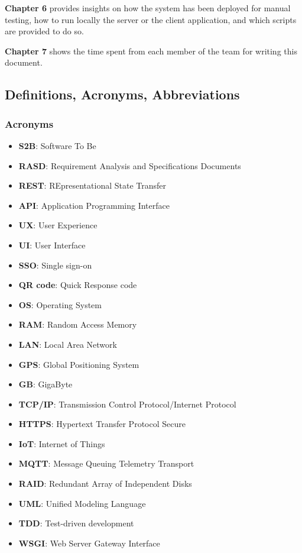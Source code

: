 \medskip

\textbf{Chapter 6} provides insights on how the system has been deployed for manual testing, how to run locally the server or the client application, and which scripts are provided to do so.

\medskip

\textbf{Chapter 7} shows the time spent from each member of the team for writing this document.

\clearpage
\subsection{Definitions, Acronyms, Abbreviations}

\subsubsection{Acronyms}

\begin{itemize}
    \item \textbf{S2B}: Software To Be
    \item \textbf{RASD}: Requirement Analysis and Specifications Documents
    \item \textbf{REST}: REpresentational State Transfer
    \item \textbf{API}: Application Programming Interface
    \item \textbf{UX}: User Experience
    \item \textbf{UI}: User Interface
    \item \textbf{SSO}: Single sign-on
    \item \textbf{QR code}: Quick Response code
    \item \textbf{OS}: Operating System
    \item \textbf{RAM}: Random Access Memory
    \item \textbf{LAN}: Local Area Network
    \item \textbf{GPS}: Global Positioning System
    \item \textbf{GB}: GigaByte
    \item \textbf{TCP/IP}: Transmission Control Protocol/Internet Protocol
    \item \textbf{HTTPS}: Hypertext Transfer Protocol Secure
    \item \textbf{IoT}: Internet of Things
    \item \textbf{MQTT}: Message Queuing Telemetry Transport
    \item \textbf{RAID}: Redundant Array of Independent Disks
    \item \textbf{UML}: Unified Modeling Language
    \item \textbf{TDD}: Test-driven development
    \item \textbf{WSGI}: Web Server Gateway Interface
\end{itemize}

